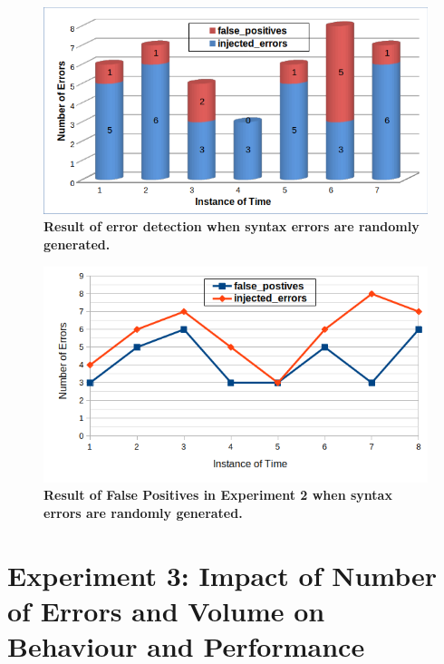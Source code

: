 	\begin{figure}[ht]
	\begin{center}
		\includegraphics[scale=0.7,angle=0]{images/Experiment02-02.png}
		\setlength\belowcaptionskip{-5mm}
		\caption{\textbf{Result of error detection when syntax errors are randomly generated.}} 
		\label{Fig:Experiment02-02}
	\end{center}
\end{figure}

	\begin{figure}[ht]
	\begin{center}
		\includegraphics[scale=0.7,angle=0]{images/Experiment02-03.png}
				\setlength\belowcaptionskip{-5mm}
		\caption{\textbf{Result of False Positives in Experiment 2 when syntax errors are randomly generated.}} 
		\label{Fig:Experiment02-03}
				\setlength\belowcaptionskip{-5mm}
		\setlength\abovecaptionskip{0mm}
	\end{center}
\end{figure}

\section{Experiment 3: Impact of Number of Errors and  Volume on Behaviour and  Performance}

